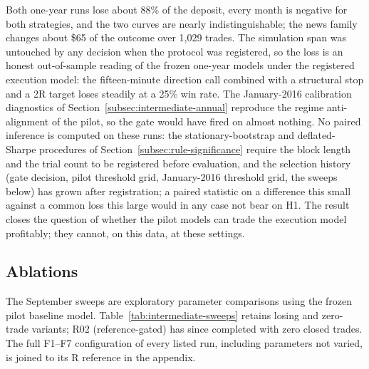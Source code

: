Both one-year runs lose about 88\% of the deposit, every month is negative for both strategies, and the two curves are nearly indistinguishable; the news family changes about \$65 of the outcome over 1,029 trades. The simulation span was untouched by any decision when the protocol was registered, so the loss is an honest out-of-sample reading of the frozen one-year models under the registered execution model: the fifteen-minute direction call combined with a structural stop and a 2R target loses steadily at a 25\% win rate. The January-2016 calibration diagnostics of Section~\ref{subsec:intermediate-annual} reproduce the regime anti-alignment of the pilot, so the gate would have fired on almost nothing. No paired inference is computed on these runs: the stationary-bootstrap and deflated-Sharpe procedures of Section~\ref{subsec:rule-significance} require the block length and the trial count to be registered before evaluation, and the selection history (gate decision, pilot threshold grid, January-2016 threshold grid, the sweeps below) has grown after registration; a paired statistic on a difference this small against a common loss this large would in any case not bear on H1. The result closes the question of whether the pilot models can trade the execution model profitably; they cannot, on this data, at these settings.

\subsection{Ablations} \label{sec:ablations}

The September sweeps are exploratory parameter comparisons using the frozen pilot baseline model. Table~\ref{tab:intermediate-sweeps} retains losing and zero-trade variants; R02 (reference-gated) has since completed with zero closed trades. The full F1--F7 configuration of every listed run, including parameters not varied, is joined to its R reference in the appendix.

